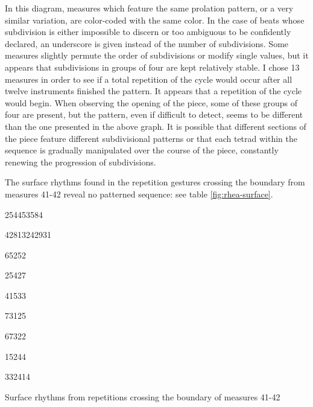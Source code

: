 In this diagram, measures which feature the same prolation pattern, or a very similar variation, are color-coded with the same color. In the case of beats whose subdivision is either impossible to discern or too ambiguous to be confidently declared, an underscore is given instead of the number of subdivisions. Some measures slightly permute the order of subdivisions or modify single values, but it appears that subdivisions in groups of four are kept relatively stable. I chose 13 measures in order to see if a total repetition of the cycle would occur after all twelve instruments finished the pattern. It appears that a repetition of the cycle would begin. When observing the opening of the piece, some of these groups of four are present, but the pattern, even if difficult to detect, seems to be different than the one presented in the above graph. It is possible that different sections of the piece feature different subdivisional patterns or that each tetrad within the sequence is gradually manipulated over the course of the piece, constantly renewing the progression of subdivisions.

The surface rhythms found in the repetition gestures crossing the boundary from  measures 41-42 reveal no patterned sequence: see table \ref{fig:rhea-surface}.

\begin{table}[H]

254453584

42813242931

65252

25427

41533

73125

67322

15244

332414
    \caption{Surface rhythms from repetitions crossing the boundary of measures 41-42}
    \label{fig:rhea-surface}
\end{table}

